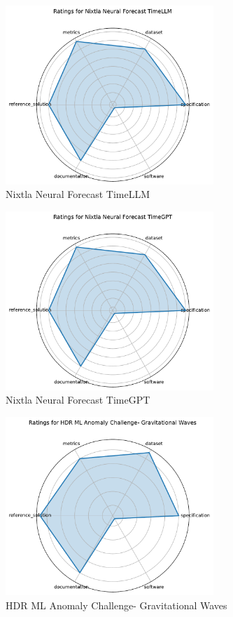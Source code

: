 \documentclass{article}
\begin{document}
\begin{figure}[h!]
  \centering
  \includegraphics[width=0.7\textwidth]{Nixtla Neural Forecast TimeLLM_radar.pdf}
  \caption{Nixtla Neural Forecast TimeLLM}
\end{figure}

\begin{figure}[h!]
  \centering
  \includegraphics[width=0.7\textwidth]{Nixtla Neural Forecast TimeGPT_radar.pdf}
  \caption{Nixtla Neural Forecast TimeGPT}
\end{figure}

\begin{figure}[h!]
  \centering
  \includegraphics[width=0.7\textwidth]{HDR ML Anomaly Challenge- Gravitational Waves_radar.pdf}
  \caption{HDR ML Anomaly Challenge- Gravitational Waves}
\end{figure}
\end{document}
